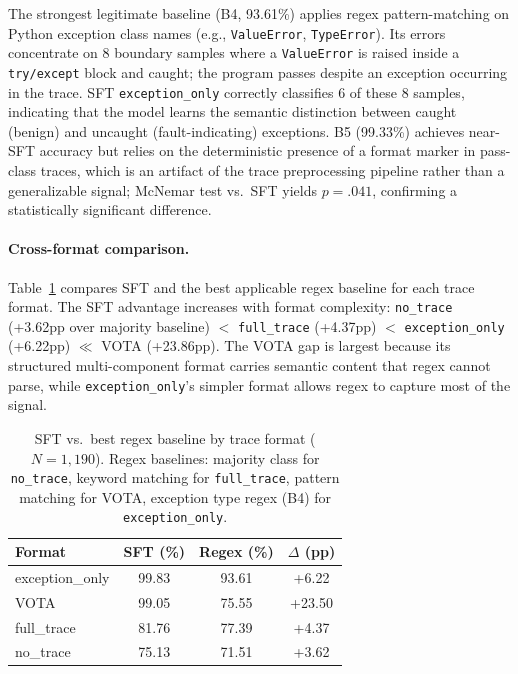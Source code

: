 The strongest legitimate baseline (B4, 93.61\%) applies regex pattern-matching on Python exception class names (e.g., \texttt{ValueError}, \texttt{TypeError}).
Its errors concentrate on 8 boundary samples where a \texttt{ValueError} is raised inside a \texttt{try/except} block and caught; the program passes despite an exception occurring in the trace.
SFT \texttt{exception\_only} correctly classifies 6 of these 8 samples, indicating that the model learns the semantic distinction between caught (benign) and uncaught (fault-indicating) exceptions.
B5 (99.33\%) achieves near-SFT accuracy but relies on the deterministic presence of a format marker in pass-class traces, which is an artifact of the trace preprocessing pipeline rather than a generalizable signal; McNemar test vs.\ SFT yields $p{=}.041$, confirming a statistically significant difference.

\paragraph{Cross-format comparison.}
Table~\ref{tab:regex_cross_format} compares SFT and the best applicable regex baseline for each trace format.
The SFT advantage increases with format complexity: \texttt{no\_trace} (+3.62pp over majority baseline) $<$ \texttt{full\_trace} (+4.37pp) $<$ \texttt{exception\_only} (+6.22pp) $\ll$ VOTA (+23.86pp).
The VOTA gap is largest because its structured multi-component format carries semantic content that regex cannot parse, while \texttt{exception\_only}'s simpler format allows regex to capture most of the signal.

\begin{table}[t]
\centering
\caption{SFT vs.\ best regex baseline by trace format ($N{=}1{,}190$). Regex baselines: majority class for \texttt{no\_trace}, keyword matching for \texttt{full\_trace}, pattern matching for VOTA, exception type regex (B4) for \texttt{exception\_only}.}
\label{tab:regex_cross_format}
\small
\begin{tabular}{lccc}
\toprule
\textbf{Format} & \textbf{SFT (\%)} & \textbf{Regex (\%)} & \textbf{$\Delta$ (pp)} \\
\midrule
exception\_only & 99.83 & 93.61 & +6.22 \\
VOTA & 99.05 & 75.55 & +23.50 \\
full\_trace & 81.76 & 77.39 & +4.37 \\
no\_trace & 75.13 & 71.51 & +3.62 \\
\bottomrule
\end{tabular}
\end{table}

